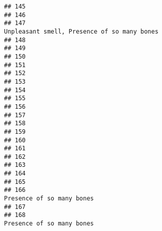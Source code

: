 \documentclass[
]{article}
\begin{document}
\begin{verbatim}
## 145                                                                                                        
## 146                                                                                                        
## 147                                                             Unpleasant smell, Presence of so many bones
## 148                                                                                                        
## 149                                                                                                        
## 150                                                                                                        
## 151                                                                                                        
## 152                                                                                                        
## 153                                                                                                        
## 154                                                                                                        
## 155                                                                                                        
## 156                                                                                                        
## 157                                                                                                        
## 158                                                                                                        
## 159                                                                                                        
## 160                                                                                                        
## 161                                                                                                        
## 162                                                                                                        
## 163                                                                                                        
## 164                                                                                                        
## 165                                                                                                        
## 166                                                                               Presence of so many bones
## 167                                                                                                        
## 168                                                                               Presence of so many bones

\end{verbatim}
\end{document}
